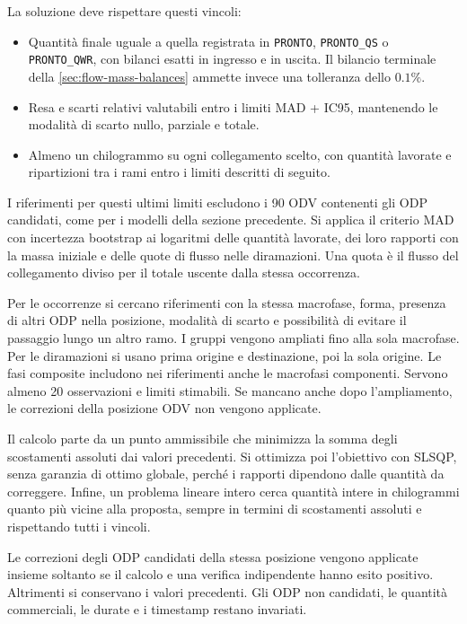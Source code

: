 La soluzione deve rispettare questi vincoli:
\begin{itemize}
\item Quantità finale uguale a quella registrata in \texttt{PRONTO}, \texttt{PRONTO\_QS} o \texttt{PRONTO\_QWR}, con bilanci esatti in ingresso e in uscita. Il bilancio terminale della \cref{sec:flow-mass-balances} ammette invece una tolleranza dello $0.1\%$.
\item Resa e scarti relativi valutabili entro i limiti MAD + IC95, mantenendo le modalità di scarto nullo, parziale e totale.
\item Almeno un chilogrammo su ogni collegamento scelto, con quantità lavorate e ripartizioni tra i rami entro i limiti descritti di seguito.
\end{itemize}

I riferimenti per questi ultimi limiti escludono i 90 ODV contenenti gli ODP candidati, come per i modelli della sezione precedente. Si applica il criterio MAD con incertezza bootstrap ai logaritmi delle quantità lavorate, dei loro rapporti con la massa iniziale e delle quote di flusso nelle diramazioni. Una quota è il flusso del collegamento diviso per il totale uscente dalla stessa occorrenza.

Per le occorrenze si cercano riferimenti con la stessa macrofase, forma, presenza di altri ODP nella posizione, modalità di scarto e possibilità di evitare il passaggio lungo un altro ramo. I gruppi vengono ampliati fino alla sola macrofase. Per le diramazioni si usano prima origine e destinazione, poi la sola origine. Le fasi composite includono nei riferimenti anche le macrofasi componenti. Servono almeno 20 osservazioni e limiti stimabili. Se mancano anche dopo l'ampliamento, le correzioni della posizione ODV non vengono applicate.

Il calcolo parte da un punto ammissibile che minimizza la somma degli scostamenti assoluti dai valori precedenti. Si ottimizza poi l'obiettivo con SLSQP, senza garanzia di ottimo globale, perché i rapporti dipendono dalle quantità da correggere. Infine, un problema lineare intero cerca quantità intere in chilogrammi quanto più vicine alla proposta, sempre in termini di scostamenti assoluti e rispettando tutti i vincoli.

Le correzioni degli ODP candidati della stessa posizione vengono applicate insieme soltanto se il calcolo e una verifica indipendente hanno esito positivo. Altrimenti si conservano i valori precedenti. Gli ODP non candidati, le quantità commerciali, le durate e i timestamp restano invariati.


